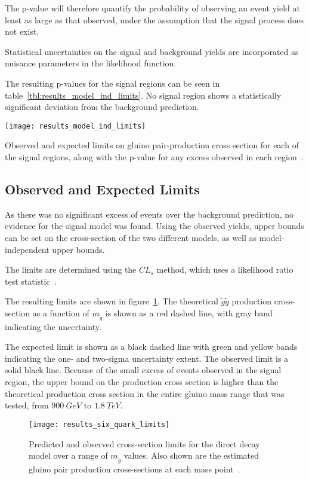 The p-value will therefore quantify the probability of observing an event yield at least as large as that observed,
under the assumption that the signal process does not exist.

Statistical uncertainties on the signal and background yields are incorporated as nuisance parameters in the likelihood
function.

The resulting p-values for the signal regions can be seen in table~\ref{tbl:results_model_ind_limits}.
No signal region shows a statistically significant deviation from the background prediction.

\begin{table}[!ht]
    \centering
    \texttt{[image: results\_model\_ind\_limits]}
    \caption{Observed and expected limits on gluino pair-production cross section for each of the signal regions,
    along with the p-value for any excess observed in each region~\cite{paper-plb}.}
\label{tbl:results_model_ind_limits}
\end{table}

\subsection{Observed and Expected Limits}\label{subsec:results_limits}

As there was no significant excess of events over the background prediction, no evidence for the signal model was found.
Using the observed yields, upper bounds can be set on the cross-section of the two different
models, as well as model-independent upper bounds.

The limits are determined using the $CL_s$ method, which uses a likelihood ratio test statistic~\cite{results-stats-cls}.

The resulting limits are shown in figure~\ref{fig:results_six_quark_limits}.
The theoretical $\tilde{g}\tilde{g}$ production cross-section as a function of $m_{\tilde{g}}$ is shown as a red dashed
line, with gray band indicating the uncertainty.

The expected limit is shown as a black dashed line with green and yellow bands indicating the one- and two-sigma uncertainty extent.
The observed limit is a solid black line.
Because of the small excess of events observed in the signal region, the upper bound on the production cross section
is higher than the theoretical production cross section in the entire gluino mass range that was tested,
from $900~GeV$ to $1.8~TeV$.

\begin{figure}[!ht]
    \centering
    \texttt{[image: results\_six\_quark\_limits]}
    \caption{Predicted and observed cross-section limits for the direct decay model over a range of $m_{\tilde{g}}$ values.
    Also shown are the estimated gluino pair production cross-sections at each mass point~\cite{paper-plb}.}
\label{fig:results_six_quark_limits}
\end{figure}

